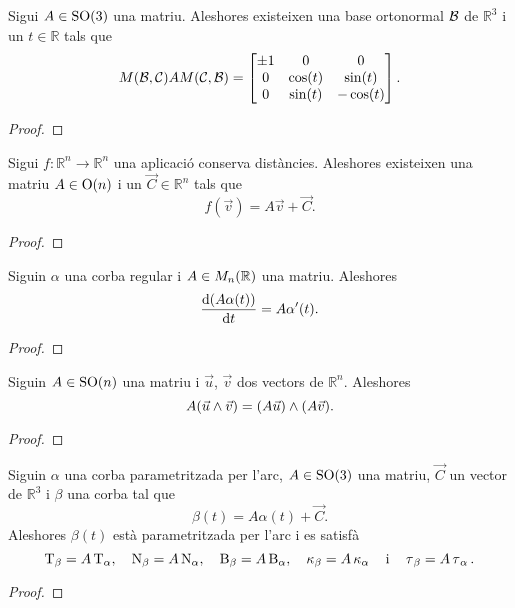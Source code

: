 \documentclass[../../Main.tex]{subfiles}
\begin{document}
	\begin{proposition}
		Sigui \(A\in\operatorname{SO}(3)\) una matriu. Aleshores existeixen una base ortonormal \(\mathcal{B}\) de \(\mathbb{R}^{3}\) i un \(t\in\mathbb{R}\) tals que
		\[M(\mathcal{B},\mathcal{C})AM(\mathcal{C},\mathcal{B})=\begin{bmatrix}
			\pm1 & 0 & 0 \\
			0 & \cos(t) & \sin(t) \\
			0 & \sin(t) & -\cos(t)
		\end{bmatrix}.\]
		\begin{proof}
		\end{proof}
	\end{proposition}
	\begin{proposition}
		\label{prop:forma matricial de les aplicacions que conserven distàncies}
		Sigui \(f\colon\mathbb{R}^{n}\longrightarrow\mathbb{R}^{n}\) una aplicació conserva distàncies. Aleshores existeixen una matriu \(A\in\operatorname{O}(n)\) i un \(\vec{C}\in\mathbb{R}^{n}\) tals que
		\[
		    f(\vec{v})=A\vec{v}+\vec{C}.
		\]
		\begin{proof}
		\end{proof}
	\end{proposition}
	\begin{proposition}
		\label{prop:derivada del producte d'una matriu per una corba}
		Siguin \(\alpha\) una corba regular i \(A\in M_{n}(\mathbb{R})\) una matriu. Aleshores
		\[
		    \frac{\mathop{}\!\mathrm{d}(A\alpha(t))}{\mathop{}\!\mathrm{d} t}=A\alpha'(t).
		\]
		\begin{proof}
		\end{proof}
	\end{proposition}
	\begin{proposition}
		\label{prop:les matrius especials ortogonals conserven el producte vectorial}
		Siguin \(A\in\operatorname{SO}(n)\) una matriu i \(\vec{u}\), \(\vec{v}\) dos vectors de \(\mathbb{R}^{n}\). Aleshores
		\[
		    A(\vec{u}\mathbin{\wedge}\vec{v})=(A\vec{u})\mathbin{\wedge}(A\vec{v}).
		\]
		\begin{proof}
		\end{proof}
	\end{proposition}
	\begin{corollary}
		\label{cor:una corba parametritzada per l'arc i la seva imatge per una aplicació que conserva les distàncies són equivalents}
		Siguin \(\alpha\) una corba parametritzada per l'arc, \(A\in\operatorname{SO}(3)\) una matriu, \(\vec{C}\) un vector de \(\mathbb{R}^{3}\) i \(\beta\) una corba tal que
		\[
		    \beta(t)=A\alpha(t)+\vec{C}.
		\]
		Aleshores \(\beta(t)\) està parametritzada per l'arc i es satisfà
		\[
		    \operatorname{T}_{\beta}=A\operatorname{T}_{\alpha},\quad\operatorname{N}_{\beta}=A\operatorname{N}_{\alpha},\quad\operatorname{B}_{\beta}=A\operatorname{B}_{\alpha},\quad\operatorname{\kappa}_{\beta}=A\operatorname{\kappa}_{\alpha}\quad\text{i}\quad\operatorname{\tau}_{\beta}=A\operatorname{\tau}_{\alpha}.
		\]
		\begin{proof}
		\end{proof}
	\end{corollary}
\end{document}
